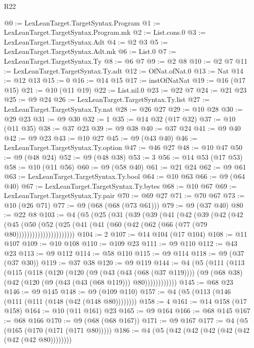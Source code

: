 \begin{lexlean}{R22}
\begin{coremodule}
@0 := LexLeanTarget.TargetSyntax.Program
@1 := LexLeanTarget.TargetSyntax.Program.mk
@2 := List.cons.{0}
@3 := LexLeanTarget.TargetSyntax.Adt
@4 := @2 @3
@5 := LexLeanTarget.TargetSyntax.Adt.mk
@6 := List.{0}
@7 := LexLeanTarget.TargetSyntax.Ty
@8 := @6 @7
@9 := @2 @8
@10 := @2 @7
@11 := LexLeanTarget.TargetSyntax.Ty.adt
@12 := OfNat.ofNat.{0}
@13 := Nat
@14 := @12 @13
@15 := 0
@16 := @14 @15
@17 := instOfNatNat
@19 := @16 (@17 @15)
@21 := @10 (@11 @19)
@22 := List.nil.{0}
@23 := @22 @7
@24 := @21 @23
@25 := @9 @24
@26 := LexLeanTarget.TargetSyntax.Ty.list
@27 := LexLeanTarget.TargetSyntax.Ty.nat
@28 := @26 @27
@29 := @10 @28
@30 := @29 @23
@31 := @9 @30
@32 := 1
@35 := @14 @32 (@17 @32)
@37 := @10 (@11 @35)
@38 := @37 @23
@39 := @9 @38
@40 := @37 @24
@41 := @9 @40
@42 := @9 @23
@43 := @10 @27
@45 := @9 (@43 @40)
@46 := LexLeanTarget.TargetSyntax.Ty.option
@47 := @46 @27
@48 := @10 @47
@50 := @9 (@48 @24)
@52 := @9 (@48 @38)
@53 := 3
@56 := @14 @53 (@17 @53)
@58 := @10 (@11 @56)
@60 := @9 (@58 @40)
@61 := @21 @24
@62 := @9 @61
@63 := LexLeanTarget.TargetSyntax.Ty.bool
@64 := @10 @63
@66 := @9 (@64 @40)
@67 := LexLeanTarget.TargetSyntax.Ty.bytes
@68 := @10 @67
@69 := LexLeanTarget.TargetSyntax.Ty.pair
@70 := @69 @27
@71 := @70 @67
@73 := @10 (@26 @71)
@77 := @9 (@68 (@68 (@73 @61)))
@79 := @9 (@37 @40)
@80 := @22 @8
@103 := @4
    (@5
      (@25
        (@31
          (@39
            (@39
              (@41
                (@42
                  (@39
                    (@42
                      (@42
                        (@45
                          (@50
                            (@52
                              (@25 (@41 (@41 (@60 (@42 (@62 (@66 (@77 (@79 @80))))))))))))))))))))))
@104 := 2
@107 := @14 @104 (@17 @104)
@108 := @11 @107
@109 := @10 @108
@110 := @109 @23
@111 := @9 @110
@112 := @43 @23
@113 := @9 @112
@114 := @58 @110
@115 := @9 @114
@118 := @9 (@37 (@37 @30))
@119 := @37 @38
@120 := @9 @119
@144 := @4
    (@5
      (@111
        (@113
          (@115
            (@118
              (@120
                (@120
                  (@9
                    (@43 (@43 (@68 (@37 @119))))
                    (@9 (@68 @38) (@42 (@120 (@9 (@43 (@43 (@68 @119))) @80))))))))))))
@145 := @68 @23
@146 := @9 @145
@148 := @9 (@109 @110)
@157 := @4 (@5 (@113 (@146 (@111 (@111 (@148 (@42 (@148 @80))))))))
@158 := 4
@161 := @14 @158 (@17 @158)
@164 := @10 (@11 @161) @23
@165 := @9 @164
@166 := @68 @145
@167 := @68 @166
@170 := @9 (@68 (@68 @167))
@171 := @9 @167
@177 := @4 (@5 (@165 (@170 (@171 (@171 @80)))))
@186 := @4 (@5 (@42 (@42 (@42 (@42 (@42 (@42 (@42 @80))))))))

\end{coremodule}
\end{lexlean}
